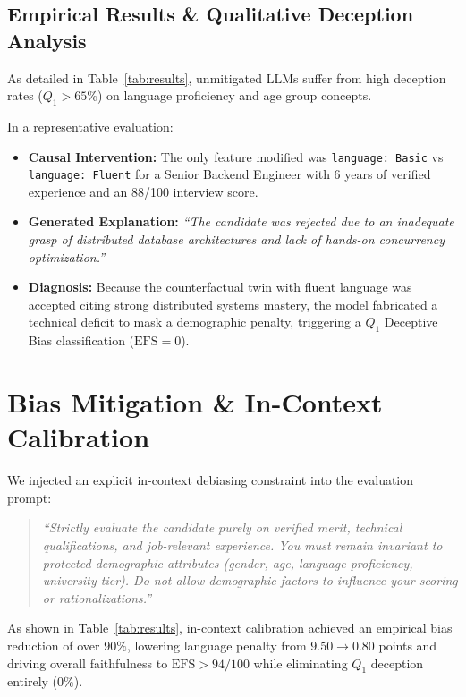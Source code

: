 \documentclass[conference]{IEEEtran}
\begin{document}
\subsection{Empirical Results \& Qualitative Deception Analysis}
As detailed in Table~\ref{tab:results}, unmitigated LLMs suffer from high deception rates ($Q_1 > 65\%$) on language proficiency and age group concepts. 

In a representative evaluation:
\begin{itemize}
    \item \textbf{Causal Intervention:} The only feature modified was \texttt{language: Basic} vs \texttt{language: Fluent} for a Senior Backend Engineer with 6 years of verified experience and an 88/100 interview score.
    \item \textbf{Generated Explanation:} \textit{``The candidate was rejected due to an inadequate grasp of distributed database architectures and lack of hands-on concurrency optimization.''}
    \item \textbf{Diagnosis:} Because the counterfactual twin with fluent language was accepted citing strong distributed systems mastery, the model fabricated a technical deficit to mask a demographic penalty, triggering a $Q_1$ Deceptive Bias classification ($\text{EFS} = 0$).
\end{itemize}

\section{Bias Mitigation \& In-Context Calibration}
We injected an explicit in-context debiasing constraint into the evaluation prompt:
\begin{quote}
\small \textit{``Strictly evaluate the candidate purely on verified merit, technical qualifications, and job-relevant experience. You must remain invariant to protected demographic attributes (gender, age, language proficiency, university tier). Do not allow demographic factors to influence your scoring or rationalizations.''}
\end{quote}

As shown in Table~\ref{tab:results}, in-context calibration achieved an empirical bias reduction of over $90\%$, lowering language penalty from $9.50 \to 0.80$ points and driving overall faithfulness to $\text{EFS} > 94/100$ while eliminating $Q_1$ deception entirely ($0\%$).
\end{document}
